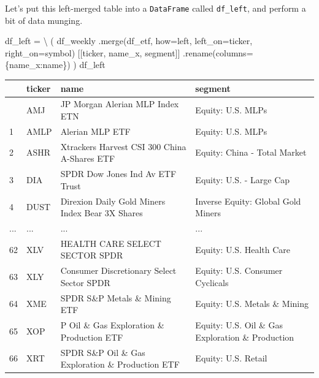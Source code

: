 \documentclass[
  letterpaper,
  DIV=11,
  numbers=noendperiod]{scrreprt}
\newenvironment{Shaded}{\begin{snugshade}}{\end{snugshade}}
\newcommand{\NormalTok}[1]{\textcolor[rgb]{0.00,0.23,0.31}{#1}}
\newcommand{\OperatorTok}[1]{\textcolor[rgb]{0.37,0.37,0.37}{#1}}
\newcommand{\StringTok}[1]{\textcolor[rgb]{0.13,0.47,0.30}{#1}}
\begin{document}
Let's put this left-merged table into a \texttt{DataFrame} called
\texttt{df\_left}, and perform a bit of data munging.

\begin{Shaded}
\begin{Highlighting}[]
\NormalTok{df\_left }\OperatorTok{=} \OperatorTok{\textbackslash{}}
\NormalTok{    (}
\NormalTok{    df\_weekly}
\NormalTok{        .merge(df\_etf, how}\OperatorTok{=}\StringTok{\textquotesingle{}left\textquotesingle{}}\NormalTok{, left\_on}\OperatorTok{=}\StringTok{\textquotesingle{}ticker\textquotesingle{}}\NormalTok{, right\_on}\OperatorTok{=}\StringTok{\textquotesingle{}symbol\textquotesingle{}}\NormalTok{)}
\NormalTok{        [[}\StringTok{\textquotesingle{}ticker\textquotesingle{}}\NormalTok{, }\StringTok{\textquotesingle{}name\_x\textquotesingle{}}\NormalTok{, }\StringTok{\textquotesingle{}segment\textquotesingle{}}\NormalTok{]]}
\NormalTok{        .rename(columns}\OperatorTok{=}\NormalTok{\{}\StringTok{\textquotesingle{}name\_x\textquotesingle{}}\NormalTok{:}\StringTok{\textquotesingle{}name\textquotesingle{}}\NormalTok{\})}
\NormalTok{    )}
\NormalTok{df\_left}
\end{Highlighting}
\end{Shaded}

\begin{longtable}[]{@{}llll@{}}
\toprule\noalign{}
& ticker & name & segment \\
\midrule\noalign{}
\endhead
\bottomrule\noalign{}
\endlastfoot
0 & AMJ & JP Morgan Alerian MLP Index ETN & Equity: U.S. MLPs \\
1 & AMLP & Alerian MLP ETF & Equity: U.S. MLPs \\
2 & ASHR & Xtrackers Harvest CSI 300 China A-Shares ETF & Equity: China
- Total Market \\
3 & DIA & SPDR Dow Jones Ind Av ETF Trust & Equity: U.S. - Large Cap \\
4 & DUST & Direxion Daily Gold Miners Index Bear 3X Shares & Inverse
Equity: Global Gold Miners \\
... & ... & ... & ... \\
62 & XLV & HEALTH CARE SELECT SECTOR SPDR & Equity: U.S. Health Care \\
63 & XLY & Consumer Discretionary Select Sector SPDR & Equity: U.S.
Consumer Cyclicals \\
64 & XME & SPDR S\&P Metals \& Mining ETF & Equity: U.S. Metals \&
Mining \\
65 & XOP & P Oil \& Gas Exploration \& Production ETF & Equity: U.S. Oil
\& Gas Exploration \& Production \\
66 & XRT & SPDR S\&P Oil \& Gas Exploration \& Production ETF & Equity:
U.S. Retail \\
\end{longtable}
\end{document}
